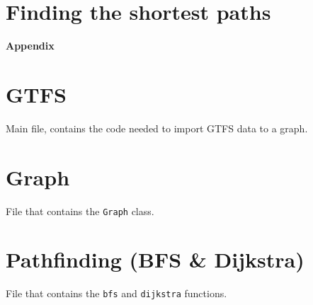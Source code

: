 \documentclass[12pt,english]{article}
\makeatletter
\let\old@appendix\appendix
\renewcommand*\appendix{
		\newpage
		\old@appendix%
		{\Huge\bfseries\noindent Appendix}
	}
\makeatother
\begin{document}
	\section{Finding the shortest paths}\label{sec:step:2}


	\appendix
	\section{GTFS}\label{sec:code:gtfs}

	Main file, contains the code needed to import GTFS data to a graph.

	

	\section{Graph}\label{sec:code:graph}

	File that contains the \texttt{Graph} class.

	

	\section{Pathfinding (BFS \& Dijkstra)}\label{sec:code:pathfinding}

	File that contains the \texttt{bfs} and \texttt{dijkstra} functions.

	
\end{document}
